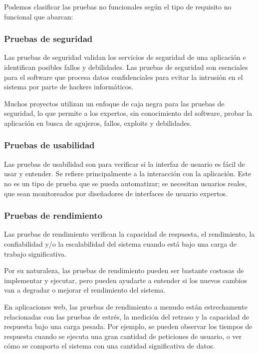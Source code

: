 Podemos clasificar las pruebas no funcionales según el tipo de requisito no funcional que abarcan:

\subsubsection{Pruebas de seguridad}

Las pruebas de seguridad validan los servicios de seguridad de una aplicación e identifican posibles fallos y debilidades. Las pruebas de seguridad son esenciales para el software que procesa datos confidenciales para evitar la intrusión en el sistema por parte de hackers informáticos.

Muchos proyectos utilizan un enfoque de caja negra para las pruebas de seguridad, lo que permite a los expertos, sin conocimiento del software, probar la aplicación en busca de agujeros, fallos, exploits y debilidades.

\subsubsection{Pruebas de usabilidad}

Las pruebas de usabilidad son para verificar si la interfaz de usuario es fácil de usar y entender. Se refiere principalmente a la interacción con la aplicación. Este no es un tipo de prueba que se pueda automatizar; se necesitan usuarios reales, que sean monitoreados por diseñadores de interfaces de usuario expertos.

\subsubsection{Pruebas de rendimiento}

Las pruebas de rendimiento verifican la capacidad de respuesta, el rendimiento, la confiabilidad y/o la escalabilidad del sistema cuando está bajo una carga de trabajo significativa.

Por su naturaleza, las pruebas de rendimiento pueden ser bastante costosas de implementar y ejecutar, pero pueden ayudarte a entender si los nuevos cambios van a degradar o mejorar el rendimiento del sistema.

En aplicaciones web, las pruebas de rendimiento a menudo están estrechamente relacionadas con las pruebas de estrés, la medición del retraso y la capacidad de respuesta bajo una carga pesada. Por ejemplo, se pueden observar los tiempos de respuesta cuando se ejecuta una gran cantidad de peticiones de usuario, o ver cómo se comporta el sistema con una cantidad significativa de datos.

